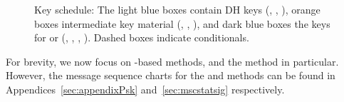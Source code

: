 \begin{figure}[h]
\centering
\scalebox{.785}{

}
\caption{Key schedule: The light blue boxes contain DH keys (\mGxy, \mGrx, \mGiy), orange boxes intermediate key material (\mPRKtwo, \mPRKthree, \mPRKfour), and dark blue boxes the keys for \mAead{} or \mXor (\mKtwoe, \mKtwom, \mKthreeae, \mKthreem). Dashed boxes indicate conditionals.}
\label{fig:kdfdiagram}
\end{figure}

%

For brevity, we now focus on \mStat{}-based methods, and the \mSigStat{} method
in particular.
%
However, the message sequence charts for the \mPskPsk{} and \mStatSig{} methods
can be found in Appendices~\ref{sec:appendixPsk} and~\ref{sec:mscstatsig}
respectively.
%

%

